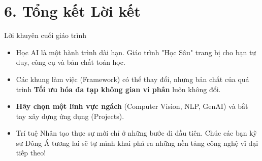 \documentclass[aspectratio=169]{beamer}
\begin{document}
\section{6. Tổng kết Lời kết}

\begin{frame}{Lời khuyên cuối giáo trình}
    \begin{itemize}
        \item Học AI là một hành trình dài hạn. Giáo trình "Học Sâu" trang bị cho bạn tư duy, công cụ và bản chất toán học.
        \item Các khung làm việc (Framework) có thể thay đổi, nhưng bản chất của quá trình \textbf{Tối ưu hóa đa tạp không gian vi phân} luôn không đổi.
        \item \textbf{Hãy chọn một lĩnh vực ngách} (Computer Vision, NLP, GenAI) và bắt tay xây dựng ứng dụng (Projects).
        \item Trí tuệ Nhân tạo thực sự mới chỉ ở những bước đi đầu tiên. Chúc các bạn kỹ sư Đông Á tương lai sẽ tự mình khai phá ra những nền tảng công nghệ vĩ đại tiếp theo!
    \end{itemize}
\end{frame}
\end{document}
